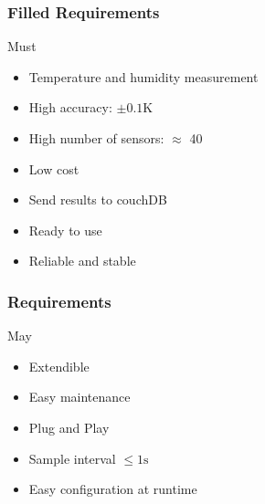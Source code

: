 \documentclass[t]{beamer}
\begin{document}
\begin{frame}[c]
    \frametitle{Filled Requirements}
		\begin{alertblock}{Must}
      \textcolor{blue!30!green}{
			\begin{itemize}
        \item Temperature and humidity measurement
        \item High accuracy: $\pm0.1\mathrm{K}$
        \item High number of sensors: $\approx$ 40
        \item Low cost
        \item Send results to couchDB
        \item Ready to use
        \item Reliable and stable
			\end{itemize}
    }
		\end{alertblock}
\end{frame}
\begin{frame}[c]
    \frametitle{Requirements}
		\begin{exampleblock}{May}
			\begin{itemize}
				\item Extendible
        \item Easy maintenance
				\item Plug and Play
				\item Sample interval $\le 1\mathrm{s}$
				\item Easy configuration at runtime
			\end{itemize}
		\end{exampleblock}
\end{frame}
\end{document}
